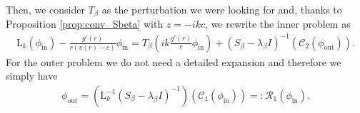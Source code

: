 \documentclass[11pt,reqno]{amsproc}
\newcommand{\rmin}{\mathrm{in}}
\newcommand{\rmout}{\mathrm{out}}
\newcommand{\rmL}{\mathrm{L}}
\newcommand{\cR}{\mathcal{R}}
\theoremstyle{definition}
\theoremstyle{definition}
\numberwithin{equation}{section}
\begin{document}
Then, we consider $T_\beta$ as the perturbation we were looking for and, thanks to Proposition \ref{prop:conv_Sbeta} with $z=-ik c$, we rewrite the inner problem as
\begin{align}
\label{eq:rayleigh_phi_Sbeta_final_inner}
\rmL_k(\phi_{\rmin})-\frac{g'(r)}{r(v(r)-c)}\phi_{\rmin} =T_\beta\left(ik\frac{g'(r)}{r}\phi_{\rmin}\right)+\left(S_\beta -\lambda_\beta I\right)^{-1}\left(\mathcal{C}_2(\phi_{\rmout})\right).
\end{align}
For the outer problem we do not need a detailed expansion and therefore we simply have 
\begin{align}
\label{eq:Lkout}
\phi_{\rmout}=\left(\rmL_k^{-1}\left(S_\beta -\lambda_\beta I\right)^{-1}\right)\left(\mathcal{C}_1(\phi_{\rmin})\right)=:\cR_1(\phi_{\rmin}).
\end{align}
\end{document}
